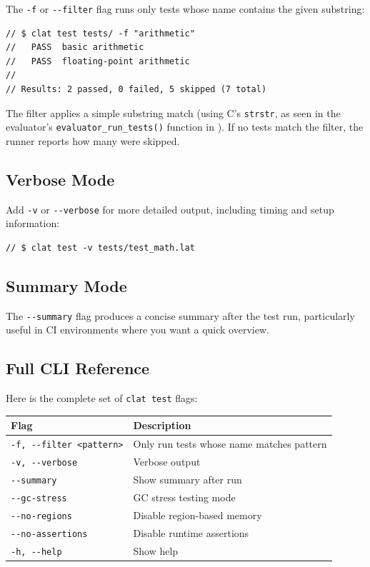 The \lstinline|-f| or \lstinline|--filter| flag runs only tests whose name contains the given substring:

\begin{lstlisting}[language=Lattice, caption={Filtering tests by name}]
// $ clat test tests/ -f "arithmetic"
//   PASS  basic arithmetic
//   PASS  floating-point arithmetic
//
// Results: 2 passed, 0 failed, 5 skipped (7 total)
\end{lstlisting}

The filter applies a simple substring match (using C's \lstinline|strstr|, as seen in the evaluator's \lstinline|evaluator_run_tests()| function in ).
If no tests match the filter, the runner reports how many were skipped.

\subsection{Verbose Mode}\label{sec:test-verbose}

Add \lstinline|-v| or \lstinline|--verbose| for more detailed output, including timing and setup information:

\begin{lstlisting}[language=Lattice, caption={Verbose test output}]
// $ clat test -v tests/test_math.lat
\end{lstlisting}

\subsection{Summary Mode}\label{sec:test-summary}

The \lstinline|--summary| flag produces a concise summary after the test run, particularly useful in CI environments where you want a quick overview.

\subsection{Full CLI Reference}\label{sec:test-cli-ref}

Here is the complete set of \lstinline|clat test| flags:

\begin{longtable}{@{}ll@{}}
\toprule
\textbf{Flag} & \textbf{Description} \\
\midrule
\endhead
\lstinline|-f, --filter <pattern>| & Only run tests whose name matches pattern \\
\lstinline|-v, --verbose| & Verbose output \\
\lstinline|--summary| & Show summary after run \\
\lstinline|--gc-stress| & GC stress testing mode \\
\lstinline|--no-regions| & Disable region-based memory \\
\lstinline|--no-assertions| & Disable runtime assertions \\
\lstinline|-h, --help| & Show help \\
\bottomrule
\end{longtable}

